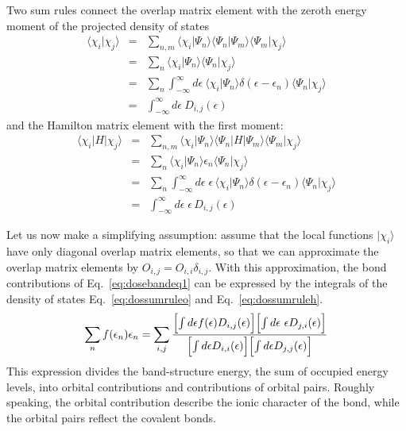 \documentclass[final,12pt,makeidx,DIV=calc]{article}
\begin{document}
{{{{{{Two sum rules connect the overlap matrix element
with the zeroth energy moment of the projected density of states
\begin{eqnarray}
\langle\chi_i|\chi_j\rangle&=&\sum_{n,m}
\langle\chi_i|\Psi_n\rangle\langle\Psi_n|\Psi_m\rangle\langle\Psi_m|\chi_j\rangle
\nonumber\\
&=&\sum_{n}\langle\chi_i|\Psi_n\rangle   \langle\Psi_n|\chi_j\rangle
\nonumber\\
&=&\sum_{n}\int_{-\infty}^{\infty} d\epsilon\ 
\langle\chi_i|\Psi_n\rangle\delta(\epsilon-\epsilon_n)
\langle\Psi_n|\chi_j\rangle
\nonumber\\
&=&\int_{-\infty}^{\infty} d\epsilon\  D_{i,j}(\epsilon)
\label{eq:dossumruleo}
\end{eqnarray}
and the Hamilton matrix element with the first moment:
\begin{eqnarray}
\langle\chi_i|H|\chi_j\rangle&=&\sum_{n,m}
\langle\chi_i|\Psi_n\rangle\langle\Psi_n|H|\Psi_m\rangle\langle\Psi_m|\chi_j\rangle
\nonumber\\
&=&\sum_{n}\langle\chi_i|\Psi_n\rangle  \epsilon_n \langle\Psi_n|\chi_j\rangle
\nonumber\\
&=&\sum_{n}\int_{-\infty}^{\infty} d\epsilon\;\epsilon\,
\langle\chi_i|\Psi_n\rangle\delta(\epsilon-\epsilon_n)
\langle\Psi_n|\chi_j\rangle
\nonumber\\
&=&\int_{-\infty}^{\infty} d\epsilon\;\epsilon\, D_{i,j}(\epsilon)
\label{eq:dossumruleh}
\end{eqnarray}

Let us now make a simplifying assumption: assume that the local
functions $|\chi_i\rangle$ have only diagonal overlap matrix elements,
so that we can approximate the overlap matrix elements by
$O_{i,j}=O_{i,i}\delta_{i,j}$.  With this approximation, the bond
contributions of Eq.~\ref{eq:dosebandeq1} can be expressed by the
integrals of the density of states Eq.~\ref{eq:dossumruleo} and
Eq.~\ref{eq:dossumruleh}.
\begin{eqnarray}
\sum_n f(\epsilon_n)\epsilon_n =
\sum_{i,j}\frac{
\Bigl[\int d\epsilon f(\epsilon) D_{i,j}(\epsilon)\Bigr]
\Bigl[\int d\epsilon\ \epsilon  D_{j,i}(\epsilon)\Bigr]
}
{
\Bigl[\int d\epsilon D_{i,i}(\epsilon)\Bigr]
\Bigl[\int d\epsilon  D_{j,j}(\epsilon)\Bigr]
}
\label{eq:dosebandfromenergyintegrals}
\end{eqnarray}
This expression divides the band-structure energy, the sum of occupied
energy levels, into orbital contributions and contributions of orbital
pairs. Roughly speaking, the orbital contribution describe the ionic
character of the bond, while the orbital pairs reflect the covalent
bonds.


}}}}}}
\end{document}

